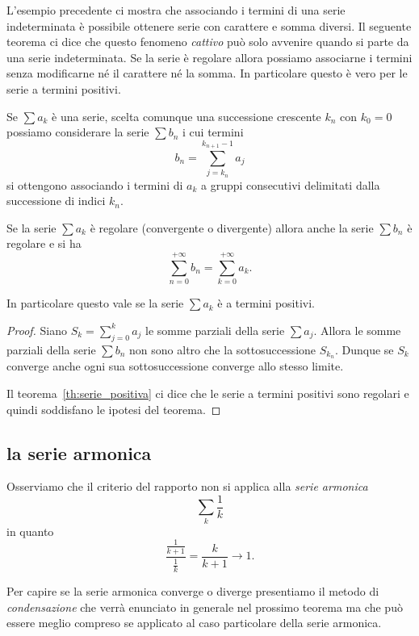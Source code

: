 L'esempio precedente ci mostra che associando i termini di una
serie indeterminata è possibile ottenere serie con carattere
e somma diversi.
Il seguente teorema ci dice che questo fenomeno \emph{cattivo}
può solo avvenire quando si parte da una serie indeterminata.
Se la serie è regolare allora possiamo associarne i termini
senza modificarne né il carattere né la somma.
In particolare questo è vero per le serie a termini positivi.

\begin{theorem}%
\label{th:serie_associativa}%
Se $\sum a_k$ è una serie, scelta comunque
una successione crescente $k_n$ con $k_0=0$
possiamo considerare la serie $\sum b_n$
i cui termini
\[
  b_n = \sum_{j=k_n}^{k_{n+1}-1} a_j
\]
si ottengono associando i termini di $a_k$ a gruppi
consecutivi delimitati dalla successione di indici
$k_n$.

Se la serie $\sum a_k$ è regolare (convergente o divergente)
allora anche la serie $\sum b_n$ è regolare e si ha
\[
\sum_{n=0}^{+\infty} b_n
= \sum_{k=0}^{+\infty} a_k.
\]

In particolare questo vale se la serie $\sum a_k$ è a termini
positivi.
\end{theorem}
%
\begin{proof}
Siano $S_k = \sum_{j=0}^k a_j$ le somme parziali della
serie $\sum a_j$. Allora le somme parziali della serie $\sum b_n$
non sono altro che la sottosuccessione $S_{k_n}$.
Dunque se $S_k$ converge anche ogni sua sottosuccessione
converge allo stesso limite.

Il teorema~\ref{th:serie_positiva} ci dice
che le serie a termini positivi sono regolari e quindi
soddisfano le ipotesi del teorema.
\end{proof}

\subsection{la serie armonica}

Osserviamo che il criterio del rapporto non si applica alla
\emph{serie armonica}%
%
%
\[
  \sum_k \frac{1}{k}
\]
in quanto
\[
 \frac{\frac{1}{k+1}}{\frac{1}{k}}
 = \frac{k}{k+1} \to 1.
\]

Per capire se la serie armonica converge o diverge presentiamo il metodo
di \emph{condensazione} che verrà enunciato in generale nel prossimo teorema
ma che può essere meglio compreso se applicato al caso particolare
della serie armonica.

